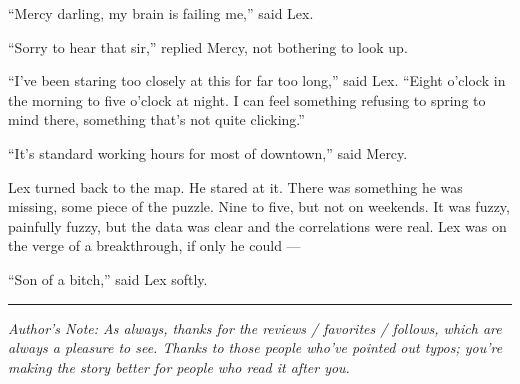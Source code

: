 ``Mercy darling, my brain is failing me,'' said Lex.

``Sorry to hear that sir,'' replied Mercy, not bothering to look up.

``I've been staring too closely at this for far too long,'' said Lex.
``Eight o'clock in the morning to five o'clock at night. I can feel
something refusing to spring to mind there, something that's not quite
clicking.''

``It's standard working hours for most of downtown,'' said Mercy.

Lex turned back to the map. He stared at it. There was something he was
missing, some piece of the puzzle. Nine to five, but not on weekends. It
was fuzzy, painfully fuzzy, but the data was clear and the correlations
were real. Lex was on the verge of a breakthrough, if only he could ---

``Son of a bitch,'' said Lex softly.

\begin{center}\rule{0.5\linewidth}{\linethickness}\end{center}

\emph{Author's Note: As always, thanks for the reviews / favorites /
follows, which are always a pleasure to see. Thanks to those people
who've pointed out typos; you're making the story better for people who
read it after you.}
